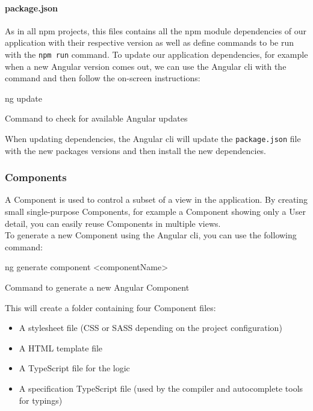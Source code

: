 \documentclass[twoside, openright,11pt,a4paper]{book}
\newenvironment{code}{\captionsetup{type=listing}}{}
\begin{document}
\paragraph{package.json}
As in all \gls{npm} projects, this files contains all the \gls{npm} module dependencies of our application with their respective version as well as define commands to be run with the \verb+npm run+ command. To update our application dependencies, for example when a new Angular version comes out, we can use the Angular \gls{cli} with the command and then follow the on-screen instructions:
\begin{code}
	\begin{shell}
ng update
	\end{shell}
	\caption{Command to check for available Angular updates}
\end{code}

When updating dependencies, the Angular \gls{cli} will update the \verb+package.json+ file with the new packages versions and then install the new dependencies.

\subsubsection{Components}
A Component\cite{angular:doc:components} is used to control a subset of a view in the application. By creating small single-purpose Components, for example a Component showing only a User detail, you can easily reuse Components in multiple views. \\

To generate a new Component using the Angular \gls{cli}, you can use the following command:
\begin{code}
	\begin{shell}
ng generate component <componentName>
	\end{shell}
	\caption{Command to generate a new Angular Component}
\end{code}

This will create a folder containing four Component files:
\begin{itemize}
	\item A stylesheet file (CSS or SASS depending on the project configuration)
	\item A HTML template file
	\item A TypeScript file for the logic
	\item A specification TypeScript file (used by the compiler and autocomplete tools for typings)
\end{itemize}
\end{document}
